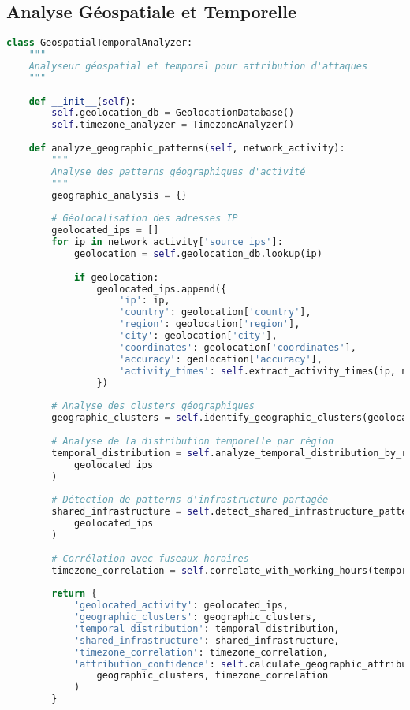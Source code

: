\subsection{Analyse Géospatiale et Temporelle}

\begin{lstlisting}[language=Python, caption=Analyseur géospatial pour attribution]
class GeospatialTemporalAnalyzer:
    """
    Analyseur géospatial et temporel pour attribution d'attaques
    """
    
    def __init__(self):
        self.geolocation_db = GeolocationDatabase()
        self.timezone_analyzer = TimezoneAnalyzer()
        
    def analyze_geographic_patterns(self, network_activity):
        """
        Analyse des patterns géographiques d'activité
        """
        geographic_analysis = {}
        
        # Géolocalisation des adresses IP
        geolocated_ips = []
        for ip in network_activity['source_ips']:
            geolocation = self.geolocation_db.lookup(ip)
            
            if geolocation:
                geolocated_ips.append({
                    'ip': ip,
                    'country': geolocation['country'],
                    'region': geolocation['region'],
                    'city': geolocation['city'],
                    'coordinates': geolocation['coordinates'],
                    'accuracy': geolocation['accuracy'],
                    'activity_times': self.extract_activity_times(ip, network_activity)
                })
                
        # Analyse des clusters géographiques
        geographic_clusters = self.identify_geographic_clusters(geolocated_ips)
        
        # Analyse de la distribution temporelle par région
        temporal_distribution = self.analyze_temporal_distribution_by_region(
            geolocated_ips
        )
        
        # Détection de patterns d'infrastructure partagée
        shared_infrastructure = self.detect_shared_infrastructure_patterns(
            geolocated_ips
        )
        
        # Corrélation avec fuseaux horaires
        timezone_correlation = self.correlate_with_working_hours(temporal_distribution)
        
        return {
            'geolocated_activity': geolocated_ips,
            'geographic_clusters': geographic_clusters,
            'temporal_distribution': temporal_distribution,
            'shared_infrastructure': shared_infrastructure,
            'timezone_correlation': timezone_correlation,
            'attribution_confidence': self.calculate_geographic_attribution_confidence(
                geographic_clusters, timezone_correlation
            )
        }
    

\end{lstlisting}
